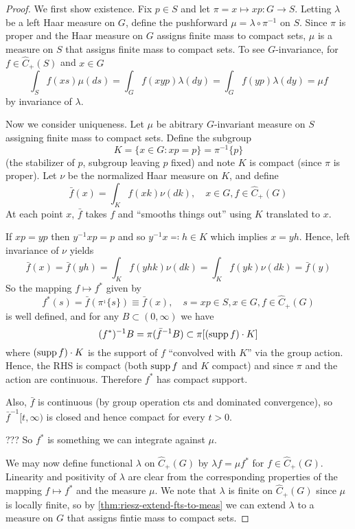\begin{proof}
  We first show existence.
  Fix $p \in S$ and let $\pi = x \mapsto x p : G \to S$.
  Letting $\lambda$ be a left Haar measure on $G$, define
  the pushforward $\mu = \lambda \circ \pi^{-1}$ on $S$.
  Since $\pi$ is proper and the Haar measure on $G$ assigns finite mass
  to compact sets, $\mu$ is a measure on $S$ that assigns finite mass to
  compact sets. To see $G$-invariance, for $f \in \hat{C}_+(S)$ and
  $x \in G$
  \[
    \int_S f(xs) \mu(ds)
    = \int_G f(xyp) \lambda(dy)
    = \int_G f(yp) \lambda(dy)
    = \mu f
  \]
  by invariance of $\lambda$.

  Now we consider uniqueness. Let $\mu$ be abitrary $G$-invariant
  measure on $S$ assigning finite mass to compact sets. Define the subgroup
  \[
    K = \{x \in G : x p = p \} = \pi^{-1}\{p\}
  \]
  (the stabilizer of $p$, subgroup leaving $p$ fixed) and note $K$ is
  compact (since $\pi$ is proper). Let $\nu$ be the normalized Haar
  measure on $K$, and define
  \[
    \bar{f}(x) = \int_K f(xk) \nu(dk), \quad x \in G, f \in \hat{C}_+(G)
  \]
  At each point $x$, $\bar{f}$ takes $f$
  and ``smooths things out'' using $K$ translated to $x$.

  If $xp = yp$ then $y^{-1} x p = p$ and so $y^{-1} x \eqqcolon h \in K$
  which implies $x = y h$. Hence, left invariance of $\nu$ yields
  \[
    \bar{f}(x) = \bar{f}(yh)
    = \int_K f(yhk) \nu(dk)
    = \int_K f(yk) \nu(dk)
    = \bar{f}(y)
  \]
  So the mapping $f \mapsto f^*$ given by
  \[
    f^*(s) = \bar{f}(\pi^{_1}\{s\}) \equiv \bar{f}(x),\quad s = xp \in S, x \in G, f \in \hat{C}_+(G)
  \]
  is well defined, and for any $B \subset (0, \infty)$ we have
  \[
    (f^*)^{-1} B = \pi (\bar{f}^{-1} B) \subset \pi[(\operatorname{supp} f) \cdot K]
  \]
  where $(\operatorname{supp} f) \cdot K$ is the support of $f$ ``convolved with $K$''
  via the group action. Hence, the RHS is compact (both $\operatorname{supp} f$ and $K$ compact)
  and since $\pi$ and the action are continuous.
  Therefore $f^*$ has compact support.

  Also, $\bar{f}$ is continuous (by group operation cts and
  dominated convergence), so $\bar{f}^{-1}[t,\infty)$
  is closed and hence compact for every $t > 0$.

  ??? So $f^*$ is something we can integrate against $\mu$.

  We may now define functional $\lambda$ on $\hat{C}_+(G)$
  by $\lambda f = \mu f^*$ for $f \in \hat{C}_+(G)$.
  Linearity and positivity of $\lambda$ are clear from the corresponding
  properties of the mapping $f \mapsto f^*$ and the measure $\mu$.
  We note that $\lambda$ is finite on $\hat{C}_+(G)$ since $\mu$ is locally
  finite, so by \cref{thm:riesz-extend-fts-to-meas} we can extend $\lambda$ to a measure
  on $G$ that assigns fintie mass to compact sets.


\end{proof}
